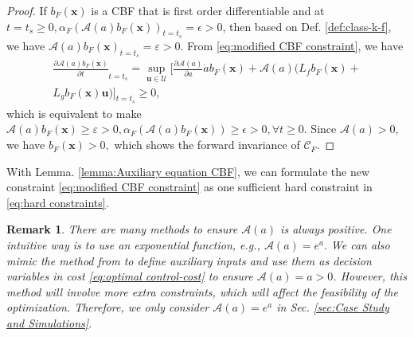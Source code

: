 \documentclass[letterpaper, 10 pt, conference]{ieeeconf}
\newtheorem{remark}{Remark}
\theoremstyle{definition}
\begin{document}
\begin{proof}
If $b_{F}(\boldsymbol{x})$ is a CBF that is first order differentiable and at $t=t_{s}\ge 0, \alpha_{F}(\mathcal{A}(a)b_{F}(\boldsymbol{x}))_{t=t_{s}}=\epsilon>0$, then based on Def. \ref{def:class-k-f}, we have $\mathcal{A}(a)b_{F}(\boldsymbol{x})_{t=t_{s}}=\varepsilon>0.$ From \eqref{eq:modified CBF constraint}, we have
\begin{equation}
\begin{split}
\frac{\partial \mathcal{A}(a)b_{F}(\boldsymbol{x})}{\partial t}_{t=t_{s}}=\sup_{\boldsymbol{u}\in \mathcal U}[\frac{\partial \mathcal{A}(a)}{\partial a}\dot{a}b_{F}(\boldsymbol{x})+ \mathcal{A}(a)(L_{f}b_{F}(\boldsymbol{x})+\\L_{g}b_{F}(\boldsymbol{x})\boldsymbol{u})]_{t=t_{s}}\ge 0,
\end{split}
\end{equation}
which is equivalent to make $\mathcal{A}(a)b_{F}(\boldsymbol{x})\ge \varepsilon> 0, \alpha_{F}(\mathcal{A}(a)b_{F}(\boldsymbol{x}))\ge \epsilon>0, \forall t\ge 0.$ Since $\mathcal{A}(a)>0$, we have $b_{F}(\boldsymbol{x})> 0,$ which shows the forward invariance of $\mathcal {C}_{F}.$  
\end{proof}
With Lemma. \ref{lemma:Auxiliary equation CBF}, we can formulate the new constraint \eqref{eq:modified CBF constraint} as one sufficient hard constraint in \eqref{eq:hard constraints}.

\begin{remark}
\label{rem:positive auxiliary equation} 
There are many methods to ensure $\mathcal{A}(a)$ is always positive. One intuitive way is to use an exponential function, e.g., $\mathcal{A}(a)=e^{a}.$ We can also mimic the method from \cite{liu2023auxiliary} to define auxiliary inputs and use them as decision variables in cost \eqref{eq:optimal control-cost} to ensure $\mathcal{A}(a)=a>0$. However, this method will involve more extra constraints, which will affect the feasibility of the optimization. Therefore, we only consider $\mathcal{A}  (a)=e^{a}$ in Sec. \ref{sec:Case Study and Simulations}.
\end{remark}
\end{document}
